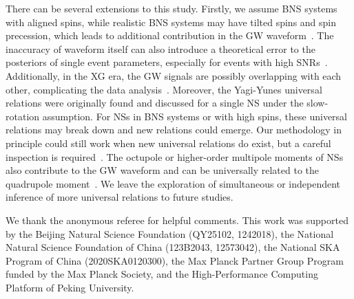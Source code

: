 \documentclass[a4paper,11pt]{article}
\begin{document}
There can be several extensions to this study. Firstly, we assume  BNS systems
with aligned spins, while realistic BNS systems may have tilted spins and spin
precession, which leads to additional contribution in the GW
waveform~\cite{Williamson:2017evr, Purrer:2019jcp, Gamba:2020wgg}. The inaccuracy of 
waveform itself can also introduce a theoretical error to the posteriors of single event 
parameters, especially for events with high SNRs~\cite{Cutler:2007mi}.
Additionally, in the XG era, the GW signals are possibly overlapping with each
other, complicating the data analysis~\cite{Pizzati:2021apa, Samajdar:2021egv,
Wang:2023ldq, Johnson:2024foj, Wang:2025ckw}.  Moreover, the Yagi-Yunes
universal relations were originally found and discussed for a single NS under the slow-rotation assumption. 
For NSs in BNS systems or with high spins, these universal relations may break down and new relations could emerge. 
Our methodology in principle could still work when new universal relations do exist, but a careful inspection is required~\cite{Shao:2022koz,
Saffer:2021gak, Doneva:2013rha, Pappas:2013naa, Chakrabarti:2013tca, Yagi:2014bxa, Doneva:2014faa, Williams:2026jqv}. The octupole or higher-order multipole moments of NSs also
contribute to the GW waveform and can be universally related to the quadrupole
moment~\cite{Yagi_2017, Abac:2023ujg}. We leave the exploration of simultaneous
or independent inference of more universal relations to future studies.

\acknowledgments

We thank the anonymous referee for helpful comments.
This work was supported by the Beijing Natural Science Foundation (QY25102,
1242018), the National Natural Science Foundation of China (123B2043, 12573042),
the National SKA Program of China (2020SKA0120300), the Max Planck Partner Group
Program funded by the Max Planck Society, and the High-Performance Computing
Platform of Peking University. 
\end{document}
